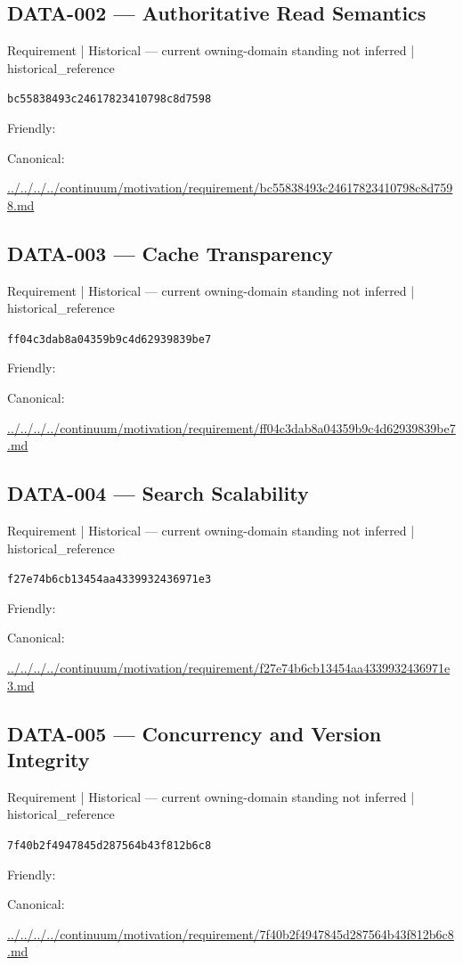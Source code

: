 \documentclass[10pt,a4paper]{article}
\begin{document}
\subsection*{DATA-002 — Authoritative Read Semantics}
{\small Requirement | Historical — current owning-domain standing not inferred | historical\_reference}\par
\texttt{bc55838493c24617823410798c8d7598}\par
Friendly: \par
Canonical: \par
{\footnotesize\url{../../../../continuum/motivation/requirement/bc55838493c24617823410798c8d7598.md}}\par
\subsection*{DATA-003 — Cache Transparency}
{\small Requirement | Historical — current owning-domain standing not inferred | historical\_reference}\par
\texttt{ff04c3dab8a04359b9c4d62939839be7}\par
Friendly: \par
Canonical: \par
{\footnotesize\url{../../../../continuum/motivation/requirement/ff04c3dab8a04359b9c4d62939839be7.md}}\par
\subsection*{DATA-004 — Search Scalability}
{\small Requirement | Historical — current owning-domain standing not inferred | historical\_reference}\par
\texttt{f27e74b6cb13454aa4339932436971e3}\par
Friendly: \par
Canonical: \par
{\footnotesize\url{../../../../continuum/motivation/requirement/f27e74b6cb13454aa4339932436971e3.md}}\par
\subsection*{DATA-005 — Concurrency and Version Integrity}
{\small Requirement | Historical — current owning-domain standing not inferred | historical\_reference}\par
\texttt{7f40b2f4947845d287564b43f812b6c8}\par
Friendly: \par
Canonical: \par
{\footnotesize\url{../../../../continuum/motivation/requirement/7f40b2f4947845d287564b43f812b6c8.md}}\par
\end{document}
